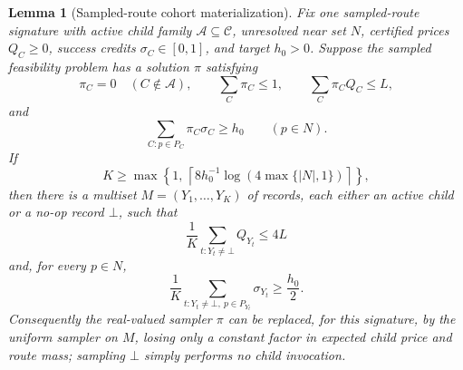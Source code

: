 \documentclass[10pt]{article}
\newtheorem{lemma}[theorem]{Lemma}
\theoremstyle{definition}
\begin{document}
\begin{lemma}[Sampled-route cohort materialization]
   \label{lem:sampled-route-cohort}
   Fix one sampled-route signature with active child family
   $\mathcal A\subseteq\mathcal C$, unresolved near set $N$, certified prices
   $Q_C\ge0$, success credits $\sigma_C\in[0,1]$, and target \(h_0>0\).
   Suppose the sampled feasibility problem has a solution $\pi$ satisfying
   \[
      \pi_C=0\quad(C\notin\mathcal A),\qquad
      \sum_C\pi_C\le1,\qquad
      \sum_C\pi_CQ_C\le L,
   \]
   and
   \[
      \sum_{C:p\in P_C}\pi_C\sigma_C\ge h_0
      \qquad(p\in N).
   \]
   If
   \[
      K\ge
      \max\left\{
         1,\,
         \left\lceil 8h_0^{-1}\log(4\max\{|N|,1\})\right\rceil
      \right\},
   \]
   then there is a multiset \(M=(Y_1,\ldots,Y_K)\) of records, each either an
   active child or a no-op record \(\bot\), such that
   \[
      \frac1K\sum_{t:Y_t\ne\bot} Q_{Y_t}\le4L
   \]
   and, for every \(p\in N\),
   \[
      \frac1K\sum_{t:Y_t\ne\bot,\ p\in P_{Y_t}}\sigma_{Y_t}
      \ge\frac{h_0}{2}.
   \]
   Consequently the real-valued sampler $\pi$ can be replaced, for this
   signature, by the uniform sampler on \(M\), losing only a constant factor in
   expected child price and route mass; sampling \(\bot\) simply performs no
   child invocation.
\end{lemma}
\end{document}
